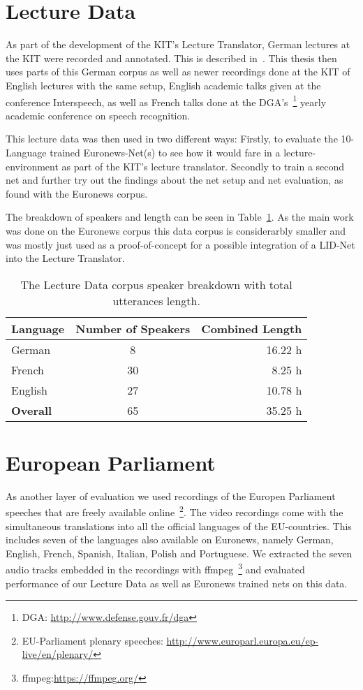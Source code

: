 \newpage
\section{Lecture Data}
\label{sec:LITasks:Lecture}

As part of the development of the KIT's Lecture Translator, German lectures at the KIT were recorded and annotated. This is described in~\cite{stuker2012kit}. This thesis then uses parts of this German corpus as well as newer recordings done at the KIT of English lectures with the same setup, English academic talks given at the conference Interspeech,  as well as French talks done at the DGA's~\footnote{DGA: \url{http://www.defense.gouv.fr/dga}} yearly academic conference on speech recognition. 

This lecture data was then used in two different ways: Firstly, to evaluate the 10-Language trained Euronews-Net(s) to see how it would fare in a lecture-environment as part of the KIT's lecture translator. Secondly to train a second net and further try out the findings about the net setup and net evaluation, as found with the Euronews corpus.

The breakdown of speakers and length can be seen in Table~\ref{tab:spkDataLD}. As the main work was done on the Euronews corpus this data corpus is considerarbly smaller and was mostly just used as a proof-of-concept for a possible integration of a LID-Net into the Lecture Translator. 
\begin{table}[h!]
\label{tab:spkDataLD}
\centering
\begin{tabular}{| l | c | r | }
	\hline
	\textbf{Language} & \textbf{Number of Speakers} & \textbf{Combined Length} \\
	\hline
	German & 8 &  16.22 h \\
	French & 30 & 8.25 h \\  
	English & 27 & 10.78 h \\ 
	\hline
	\textbf{Overall} & 65 & 35.25 h\\
	\hline
	
\end{tabular}
\caption{The Lecture Data corpus speaker breakdown with total utterances length.}
\end{table}

\section{European Parliament}
\label{sec:LITasks:EU}

As another layer of evaluation we used recordings of the Europen Parliament speeches that are freely available online~\footnote{EU-Parliament plenary speeches: \url{http://www.europarl.europa.eu/ep-live/en/plenary/}}. The video recordings come with the simultaneous translations into all the official languages of the EU-countries. This includes seven of the languages also available on Euronews, namely German, English, French, Spanish, Italian, Polish and Portuguese. We extracted the seven audio tracks embedded in the recordings with ffmpeg~\footnote{ffmpeg:\url{https://ffmpeg.org/}} and evaluated performance of our Lecture Data as well as Euronews trained nets on this data.

